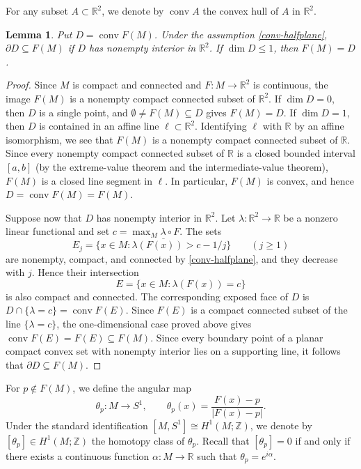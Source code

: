 \documentclass[11pt,reqno]{amsart}
\newtheorem{lemma}[theorem]{Lemma}
\theoremstyle{remark}
\newcommand{\R}{\mathbb R}
\newcommand{\Z}{\mathbb Z}
\DeclareMathOperator{\conv}{conv}
\begin{document}
For any subset $A\subset\R^2$, we denote by $\conv A$ the convex hull of
$A$ in $\R^2$.

\begin{lemma}\label{conv-boundary}
Put $D=\conv F(M)$. Under the assumption \eqref{conv-halfplane},
$\partial D\subseteq F(M)$ if $D$ has nonempty interior in $\R^2$.
If $\dim D\le1$, then $F(M)=D$.
\end{lemma}
\begin{proof}
Since $M$ is compact and connected and $F:M\to\R^2$ is continuous, the
image $F(M)$ is a nonempty compact connected subset of $\R^2$. If
$\dim D=0$, then $D$ is a single point, and $\emptyset\ne F(M)\subseteq D$
gives $F(M)=D$. If $\dim D=1$, then $D$ is contained in an affine line
$\ell\subset\R^2$. Identifying $\ell$ with $\R$ by an affine
isomorphism, we see that $F(M)$ is a nonempty compact connected subset
of $\R$. Since every nonempty compact connected subset of $\R$ is a
closed bounded interval $[a,b]$ (by the extreme-value theorem and the
intermediate-value theorem), $F(M)$ is a closed line segment in $\ell$.
In particular, $F(M)$ is convex, and hence $D=\conv F(M)=F(M)$.

Suppose now that $D$ has nonempty interior in $\R^2$. Let
$\lambda:\R^2\to\R$ be a nonzero linear functional and set
$c=\max_M\lambda\circ F$. The sets
\[
 E_j=\overline{\{x\in M:\lambda(F(x))>c-1/j\}}
 \qquad(j\ge1)
\]
are nonempty, compact, and connected by \eqref{conv-halfplane}, and they
decrease with $j$. Hence their intersection
\[
 E=\{x\in M:\lambda(F(x))=c\}
\]
is also compact and connected. The corresponding exposed face of $D$ is
$D\cap\{\lambda=c\}=\conv F(E)$. Since $F(E)$ is a compact connected
subset of the line $\{\lambda=c\}$, the one-dimensional case proved
above gives $\conv F(E)=F(E)\subseteq F(M)$. Since every boundary point
of a planar compact convex set with nonempty interior lies on a
supporting line, it follows that $\partial D\subseteq F(M)$.
\end{proof}

For $p\notin F(M)$, we define the angular map
\[
 \theta_p:M\longrightarrow S^1,
 \qquad \theta_p(x)=\frac{F(x)-p}{|F(x)-p|}.
\]
Under the standard identification $[M,S^1]\cong H^1(M;\Z)$, we denote by
$[\theta_p]\in H^1(M;\Z)$ the homotopy class of $\theta_p$. Recall that
$[\theta_p]=0$ if and only if there exists a continuous function
$\alpha:M\to\R$ such that $\theta_p=e^{i\alpha}$.
\end{document}
